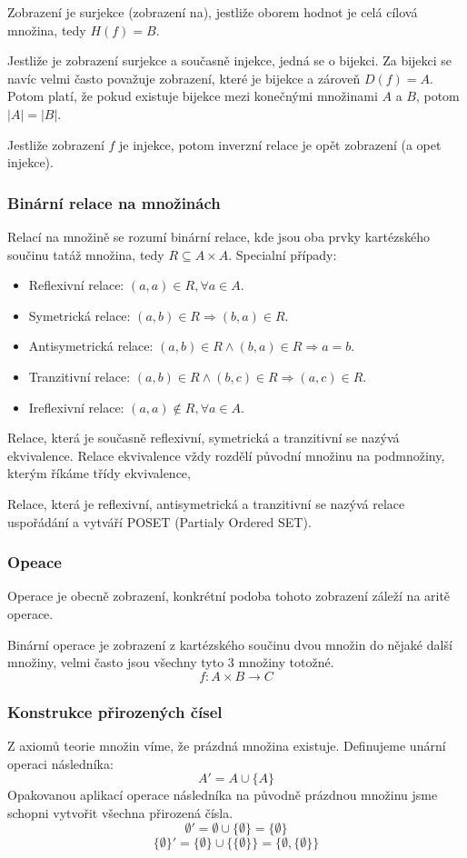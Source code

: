 Zobrazení je surjekce (zobrazení na), jestliže oborem hodnot je celá cílová množina, tedy $H(f) = B$.

Jestliže je zobrazení surjekce a současně injekce, jedná se o bijekci. Za bijekci se navíc velmi
často považuje zobrazení, které je bijekce a zároveň $D(f) = A$.
Potom platí, že pokud existuje bijekce mezi konečnými množinami $A$ a $B$, potom $|A| = |B|$.

Jestliže zobrazení $f$ je injekce, potom inverzní relace je opět zobrazení (a opet injekce).

\subsubsection*{Binární relace na množinách}
Relací na množině se rozumí binární relace, kde jsou oba prvky kartézského součinu tatáž
množina, tedy $R \subseteq A \times A$.
Specialní případy:
\begin{itemize}
	\item Reflexivní relace: $(a, a) \in R, \forall a \in A$.
	\item Symetrická relace: $(a, b) \in R \Rightarrow (b, a) \in R$.
	\item Antisymetrická relace: $(a, b) \in R \wedge (b, a) \in R \Rightarrow a = b$.
	\item Tranzitivní relace: $(a, b) \in R \wedge (b, c) \in R \Rightarrow (a, c) \in R$.
	\item Ireflexivní relace: $(a, a) \notin R, \forall a \in A$.
\end{itemize}
Relace, která je současně reflexivní, symetrická a tranzitivní se nazývá ekvivalence.
Relace ekvivalence vždy rozdělí původní množinu na podmnožiny, kterým říkáme třídy ekvivalence,

Relace, která je reflexivní, antisymetrická a tranzitivní se nazývá relace uspořádání a vytváří
POSET (Partialy Ordered SET).

\subsubsection*{Opeace}
Operace je obecně zobrazení, konkrétní podoba tohoto zobrazení záleží na aritě operace.

Binární operace je zobrazení z kartézského součinu dvou množin do nějaké další množiny, velmi často
jsou všechny tyto 3 množiny totožné.
$$f: A \times B \rightarrow C$$

\subsubsection*{Konstrukce přirozených čísel}
Z axiomů teorie množin víme, že prázdná množina existuje. Definujeme unární operaci následníka:
$$A' = A \cup \{A\}$$
Opakovanou aplikací operace následníka na původně prázdnou množinu jsme schopni vytvořit
všechna přirozená čísla.
$$\emptyset' = \emptyset \cup \{\emptyset\} = \{\emptyset\}$$
$$\{\emptyset\}' = \{\emptyset\} \cup \{\{\emptyset\}\} = \{\emptyset, \{\emptyset\}\}$$

